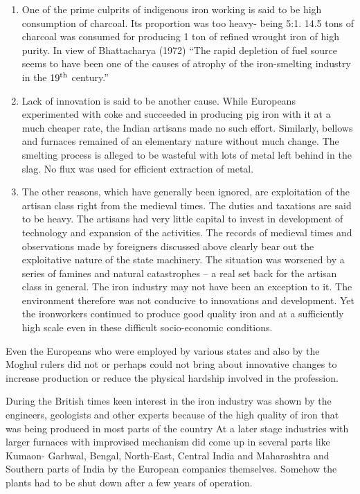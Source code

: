 \begin{enumerate}
\item One of the prime culprits of indigenous iron working is said to be high consumption of charcoal. Its proportion was too heavy- being 5:1. 14.5 tons of charcoal was consumed for producing 1 ton of refined wrought iron of high purity. In view of Bhattacharya (1972) “The rapid depletion of fuel source seems to have been one of the causes of atrophy of the iron-smelting industry in the $19^{\rm th}$ century.”
\item Lack of innovation is said to be another cause. While Europeans experimented with coke and succeeded in producing pig iron with it at a much cheaper rate, the Indian artisans made no such effort. Similarly, bellows and furnaces remained of an elementary nature without much change. The smelting process is alleged to be wasteful with lots of metal left behind in the slag. No flux was used for efficient extraction of metal.
\item The other reasons, which have generally been ignored, are exploitation of the artisan class right from the medieval times. The duties and taxations are said to be heavy. The artisans had very little capital to invest in development of technology and expansion of the activities. The records of medieval times and observations made by foreigners discussed above clearly bear out the exploitative nature of the state machinery. The situation was worsened by a series of famines and natural catastrophes – a real set back for the artisan class in general. The iron industry may not have been an exception to it. The environment therefore was not conducive to innovations and development. Yet the ironworkers continued to produce good quality iron and at a sufficiently high scale even in these difficult socio-economic conditions.
\end{enumerate}

Even the Europeans who were employed by various states and also by the Moghul rulers did not or perhaps could not bring about innovative changes to increase production or reduce the physical hardship involved in the profession. 

During the British times keen interest in the iron industry was shown by the engineers, geologists and other experts because of the high quality of iron that was being produced in most parts of the country At a later stage industries with larger furnaces with improvised mechanism did come up in several parts like Kumaon- Garhwal, Bengal, North-East, Central India and Maharashtra and Southern parts of India by the European companies themselves. Somehow the plants had to be shut down after a few years of operation. 

